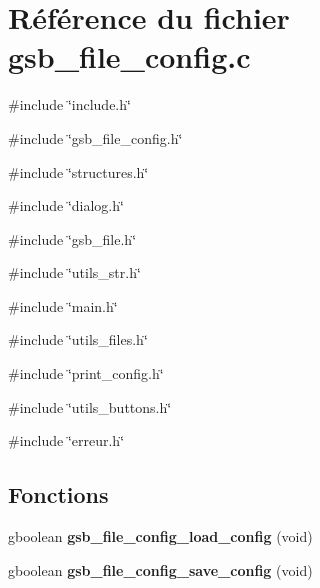 \section{Référence du fichier gsb\_\-file\_\-config.c}
\label{gsb__file__config_8c}
{\ttfamily \#include \char`\"{}include.h\char`\"{}}\par
{\ttfamily \#include \char`\"{}gsb\_\-file\_\-config.h\char`\"{}}\par
{\ttfamily \#include \char`\"{}structures.h\char`\"{}}\par
{\ttfamily \#include \char`\"{}dialog.h\char`\"{}}\par
{\ttfamily \#include \char`\"{}gsb\_\-file.h\char`\"{}}\par
{\ttfamily \#include \char`\"{}utils\_\-str.h\char`\"{}}\par
{\ttfamily \#include \char`\"{}main.h\char`\"{}}\par
{\ttfamily \#include \char`\"{}utils\_\-files.h\char`\"{}}\par
{\ttfamily \#include \char`\"{}print\_\-config.h\char`\"{}}\par
{\ttfamily \#include \char`\"{}utils\_\-buttons.h\char`\"{}}\par
{\ttfamily \#include \char`\"{}erreur.h\char`\"{}}\par
\subsection*{Fonctions}
\begin{DoxyCompactItemize}
\item 
gboolean {\bf gsb\_\-file\_\-config\_\-load\_\-config} (void)
\item 
gboolean {\bf gsb\_\-file\_\-config\_\-save\_\-config} (void)
\end{DoxyCompactItemize}
